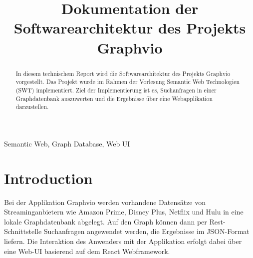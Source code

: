 \documentclass[conference]{IEEEtran}
\begin{document}
\title{Dokumentation der Softwarearchitektur des Projekts Graphvio}


\author{
	
	
	\and

}

\maketitle

\begin{abstract}
In diesem technischem Report wird die Softwarearchitektur des Projekts 
Graphvio vorgestellt. Das Projekt wurde im Rahmen der Vorlesung Semantic 
Web Technologien (SWT) implementiert. Ziel der Implementierung ist es, 
Suchanfragen in einer Graphdatenbank auszuwerten und die Ergebnisse 
über eine Webapplikation darzustellen.
\end{abstract}

\begin{IEEEkeywords}
 Semantic Web, Graph Database, Web UI
\end{IEEEkeywords}

\section{Introduction}
Bei der Applikation Graphvio werden vorhandene Datensätze von Streaminganbietern wie 
Amazon Prime, Disney Plus, Netflix und Hulu in eine lokale Graphdatenbank abgelegt.
Auf den Graph können dann per Rest-Schnittstelle Suchanfragen angewendet werden, die Ergebnisse
im JSON-Format liefern. Die Interaktion des Anwenders mit der Applikation erfolgt dabei über eine Web-UI basierend auf dem 
React Webframework.
\end{document}
